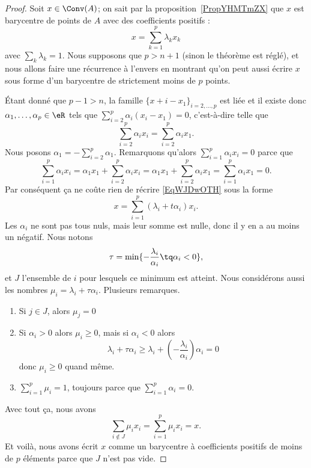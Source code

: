 \begin{proof}
	Soit \( x\in\Conv(A)\); on sait par la proposition~\ref{PropYHMTmZX} que \( x\) est barycentre de points de \( A\) avec des coefficients positifs :
	\begin{equation}    \label{EqWJDwOTH}
		x=\sum_{k=1}^p\lambda_kx_k
	\end{equation}
	avec \( \sum_k\lambda_k=1\). Nous supposons que \( p>n+1\) (sinon le théorème est réglé), et nous allons faire une récurrence à l'envers en montrant qu'on peut aussi écrire \( x\) sous forme d'un barycentre de strictement moins de \( p\) points.

	Étant donné que \( p-1>n\), la famille \( \{ x+i-x_1 \}_{i=2,\ldots, p}\) est liée et il existe donc \( \alpha_1,\ldots, \alpha_p\in \eR\) tels que \( \sum_{i=2}^p\alpha_i(x_i-x_1)=0\), c'est-à-dire telle que
	\begin{equation}
		\sum_{i=2}^p\alpha_ix_i=\sum_{i=2}^p\alpha_ix_1.
	\end{equation}
	Nous posons \( \alpha_1=-\sum_{i=2}^p\alpha_1\). Remarquons qu'alors \( \sum_{i=1}^p\alpha_ix_i=0\) parce que
	\begin{equation}
		\sum_{i=1}^p\alpha_ix_i=\alpha_1x_1+\sum_{i=2}^p\alpha_ix_i=\alpha_1x_1+\sum_{i=2}^p\alpha_ix_1=\sum_{i=1}^p\alpha_ix_1=0.
	\end{equation}
	Par conséquent ça ne coûte rien de récrire \eqref{EqWJDwOTH} sous la forme
	\begin{equation}
		x=\sum_{i=1}^p(\lambda_i+t\alpha_i)x_i.
	\end{equation}
	Les \( \alpha_i\) ne sont pas tous nuls, mais leur somme est nulle, donc il y en a au moins un négatif. Nous notons
	\begin{equation}
		\tau=\min\{ -\frac{ \lambda_i }{ \alpha_i }\tq \alpha_i<0 \},
	\end{equation}
	et \( J\) l'ensemble de \( i\) pour lesquels ce minimum est atteint. Nous considérons aussi les nombres \( \mu_i=\lambda_i+\tau\alpha_i\). Plusieurs remarques.
	\begin{enumerate}
		\item
		      Si \( j\in J\), alors \( \mu_j=0\)
		\item
		      Si \( \alpha_i>0\) alors \( \mu_i\geq 0\), mais si \( \alpha_i<0\) alors
		      \begin{equation}
			      \lambda_i+\tau\alpha_i\geq \lambda_i+(-\frac{ \lambda_i }{ \alpha_i })\alpha_i=0
		      \end{equation}
		      donc \( \mu_i\geq 0\) quand même.
		\item
		      \( \sum_{i=1}^p\mu_i=1\), toujours parce que \( \sum_{i=1}^p\alpha_i=0\).
	\end{enumerate}
	Avec tout ça, nous avons
	\begin{equation}
		\sum_{i\notin J}\mu_ix_i=\sum_{i=1}^p\mu_ix_i=x.
	\end{equation}
	Et voilà, nous avons écrit \( x\) comme un barycentre à coefficients positifs de moins de \( p\) éléments parce que \( J\) n'est pas vide.
\end{proof}

